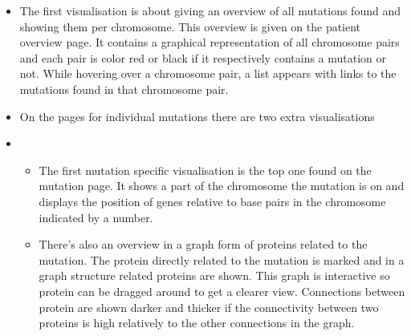 \begin{itemize}
  \item The first visualisation is about giving an overview of all mutations found and showing them per chromosome. This overview is given on the patient overview page. It contains a graphical representation of all chromosome pairs and each pair is color red or black if it respectively contains a mutation or not. While hovering over a chromosome pair, a list appears with links to the mutations found in that chromosome pair.
  \item On the pages for individual mutations there are two extra visualisations
  \item
  \begin{itemize}
     \item The first mutation specific visualisation is the top one found on the mutation page. It shows a part of the chromosome the mutation is on and displays the position of genes relative to base pairs in the chromosome indicated by a number.
     \item There's also an overview in a graph form of proteins related to the mutation. The protein directly related to the mutation is marked and in a graph structure related proteins are shown. This graph is interactive so protein can be dragged around to get a clearer view. Connections between protein are shown darker and thicker if the connectivity between two proteins is high relatively to the other connections in the graph.
  \end{itemize}
\end{itemize}